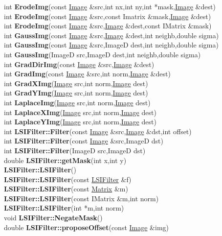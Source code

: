 \documentclass[10pt,titlepage]{article}
\def\functionlistentry#1#2#3#4#5#6{\noindent #1 {\bf #2}(#3) \dotfill #6\\}
\begin{document}
{{\functionlistentry{int}{ErodeImg}{const \hyperlink{Image}{Image} \&src,int nx,int ny,int *mask,\hyperlink{Image}{Image} \&dest}{370}{filter}{}
\functionlistentry{int}{ErodeImg}{const \hyperlink{Image}{Image} \&src,const Imatrix \&mask,\hyperlink{Image}{Image} \&dest}{371}{filter}{}
\functionlistentry{int}{ErodeImg}{const \hyperlink{Image}{Image} \&src,\hyperlink{Image}{Image} \&dest,const IMatrix \&mask}{372}{filter}{}
\functionlistentry{int}{GaussImg}{const \hyperlink{Image}{Image} \&src,\hyperlink{Image}{Image} \&dest,int neighb,double sigma}{352}{filter}{}
\functionlistentry{int}{GaussImg}{const \hyperlink{Image}{Image} \&src,ImageD dest,int neighb,double sigma}{353}{filter}{}
\functionlistentry{int}{GaussImg}{ImageD src,ImageD dest,int neighb,double sigma}{354}{filter}{}
\functionlistentry{int}{GradDirImg}{const \hyperlink{Image}{Image} \&src,\hyperlink{Image}{Image} \&dest}{359}{filter}{}
\functionlistentry{int}{GradImg}{const \hyperlink{Image}{Image} \&src,int norm,\hyperlink{Image}{Image} \&dest}{358}{filter}{}
\functionlistentry{int}{GradXImg}{\hyperlink{Image}{Image} src,int norm,\hyperlink{Image}{Image} dest}{346}{filter}{}
\functionlistentry{int}{GradYImg}{\hyperlink{Image}{Image} src,int norm,\hyperlink{Image}{Image} dest}{347}{filter}{}
\functionlistentry{int}{LaplaceImg}{\hyperlink{Image}{Image} src,int norm,\hyperlink{Image}{Image} dest}{351}{filter}{}
\functionlistentry{int}{LaplaceXImg}{\hyperlink{Image}{Image} src,int norm,\hyperlink{Image}{Image} dest}{349}{filter}{}
\functionlistentry{int}{LaplaceYImg}{\hyperlink{Image}{Image} src,int norm,\hyperlink{Image}{Image} dest}{350}{filter}{}
\functionlistentry{int}{LSIFilter::Filter}{const \hyperlink{Image}{Image} \&src,\hyperlink{Image}{Image} \&dst,int offset}{330}{filter}{}
\functionlistentry{int}{LSIFilter::Filter}{const \hyperlink{Image}{Image} \&src,ImageD dst}{331}{filter}{}
\functionlistentry{int}{LSIFilter::Filter}{ImageD src,ImageD dst}{332}{filter}{}
\functionlistentry{double}{LSIFilter::getMask}{int x,int y}{323}{filter}{}
\functionlistentry{}{LSIFilter::LSIFilter}{}{318}{filter}{}
\functionlistentry{}{LSIFilter::LSIFilter}{const \hyperlink{LSIFilter}{LSIFilter} \&f}{319}{filter}{}
\functionlistentry{}{LSIFilter::LSIFilter}{const \hyperlink{Matrix}{Matrix} \&m}{320}{filter}{}
\functionlistentry{}{LSIFilter::LSIFilter}{const IMatrix \&m,int norm}{321}{filter}{}
\functionlistentry{}{LSIFilter::LSIFilter}{int *m,int norm}{322}{filter}{}
\functionlistentry{void}{LSIFilter::NegateMask}{}{324}{filter}{}
\functionlistentry{double}{LSIFilter::proposeOffset}{const \hyperlink{Image}{Image} \&img}{325}{filter}{}
}}
\end{document}
